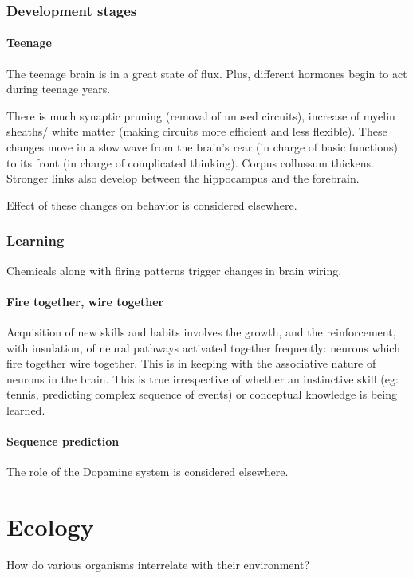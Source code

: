 \documentclass[oneside, article]{memoir}
\begin{document}
\section{Development stages}
\subsection{Teenage}
The teenage brain is in a great state of flux. Plus, different hormones begin to act during teenage years.

There is much synaptic pruning (removal of unused circuits), increase of myelin sheaths/ white matter (making circuits more efficient and less flexible). These changes move in a slow wave from the brain's rear (in charge of basic functions) to its front (in charge of complicated thinking). Corpus collussum thickens. Stronger links also develop between the hippocampus and the forebrain.

Effect of these changes on behavior is considered elsewhere.

\section{Learning}
Chemicals along with firing patterns trigger changes in brain wiring.

\subsection{Fire together, wire together}
Acquisition of new skills and habits involves the growth, and the reinforcement, with insulation, of neural pathways activated together frequently: neurons which fire together wire together. This is in keeping with the associative nature of neurons in the brain. This is true irrespective of whether an instinctive skill (eg: tennis, predicting complex sequence of events) or conceptual knowledge is being learned.

\subsection{Sequence prediction}
The role of the Dopamine system is considered elsewhere.


\part{Ecology}
How do various organisms interrelate with their environment?


% 
% 
\end{document}
